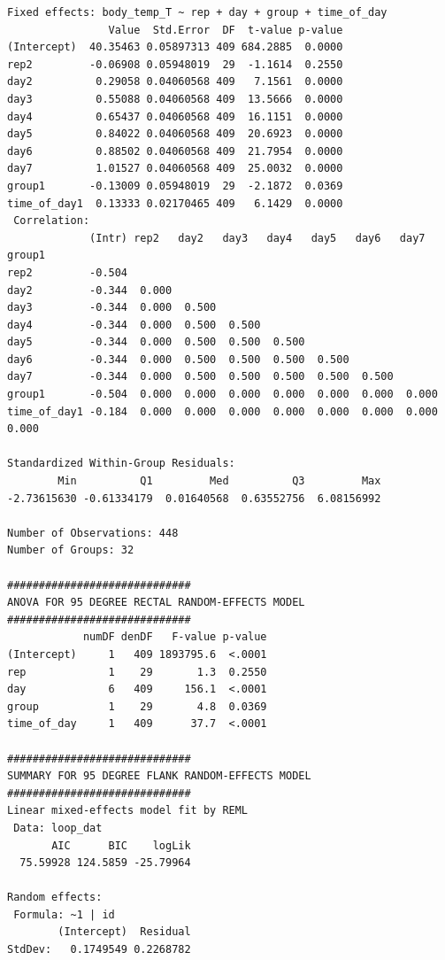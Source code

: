 \documentclass[a4paper, 10pt, titlepage]{article}
\begin{document}
\begin{lstlisting}[basicstyle = \footnotesize \ttfamily]
Fixed effects: body_temp_T ~ rep + day + group + time_of_day 
                Value  Std.Error  DF  t-value p-value
(Intercept)  40.35463 0.05897313 409 684.2885  0.0000
rep2         -0.06908 0.05948019  29  -1.1614  0.2550
day2          0.29058 0.04060568 409   7.1561  0.0000
day3          0.55088 0.04060568 409  13.5666  0.0000
day4          0.65437 0.04060568 409  16.1151  0.0000
day5          0.84022 0.04060568 409  20.6923  0.0000
day6          0.88502 0.04060568 409  21.7954  0.0000
day7          1.01527 0.04060568 409  25.0032  0.0000
group1       -0.13009 0.05948019  29  -2.1872  0.0369
time_of_day1  0.13333 0.02170465 409   6.1429  0.0000
 Correlation: 
             (Intr) rep2   day2   day3   day4   day5   day6   day7   group1
rep2         -0.504                                                        
day2         -0.344  0.000                                                 
day3         -0.344  0.000  0.500                                          
day4         -0.344  0.000  0.500  0.500                                   
day5         -0.344  0.000  0.500  0.500  0.500                            
day6         -0.344  0.000  0.500  0.500  0.500  0.500                     
day7         -0.344  0.000  0.500  0.500  0.500  0.500  0.500              
group1       -0.504  0.000  0.000  0.000  0.000  0.000  0.000  0.000       
time_of_day1 -0.184  0.000  0.000  0.000  0.000  0.000  0.000  0.000  0.000

Standardized Within-Group Residuals:
        Min          Q1         Med          Q3         Max 
-2.73615630 -0.61334179  0.01640568  0.63552756  6.08156992 

Number of Observations: 448
Number of Groups: 32 

############################# 
ANOVA FOR 95 DEGREE RECTAL RANDOM-EFFECTS MODEL 
#############################
            numDF denDF   F-value p-value
(Intercept)     1   409 1893795.6  <.0001
rep             1    29       1.3  0.2550
day             6   409     156.1  <.0001
group           1    29       4.8  0.0369
time_of_day     1   409      37.7  <.0001

############################# 
SUMMARY FOR 95 DEGREE FLANK RANDOM-EFFECTS MODEL 
#############################
Linear mixed-effects model fit by REML
 Data: loop_dat 
       AIC      BIC    logLik
  75.59928 124.5859 -25.79964

Random effects:
 Formula: ~1 | id
        (Intercept)  Residual
StdDev:   0.1749549 0.2268782


\end{lstlisting}
\end{document}
